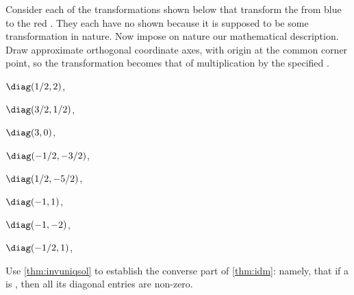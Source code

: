 \begin{reduce}
\begin{exercise}  
Consider each of the transformations shown below that transform the from blue  to the red .
They each have no  shown because it is supposed to be some transformation in nature. 
Now impose on nature our mathematical description.
Draw approximate orthogonal coordinate axes, with origin at the common corner point, so the transformation becomes that of multiplication by the specified .
\begin{Parts}
\item \(\diag(1/2,2)\),

\item \(\diag(3/2,1/2)\),

\item \(\diag(3,0)\),

\item \(\diag(-1/2,-3/2)\),

\item \(\diag(1/2,-5/2)\),

\item \(\diag(-1,1)\),

\item \(\diag(-1,-2)\),

\item \(\diag(-1/2,1)\),

\end{Parts}
\end{exercise}
\end{reduce}



\begin{exercise} \label{ex:idmc} 
Use \cref{thm:invuniqsol} to establish the converse part of \cref{thm:idm}: namely, that if a  is , then all its diagonal entries are non-zero.
\end{exercise}



